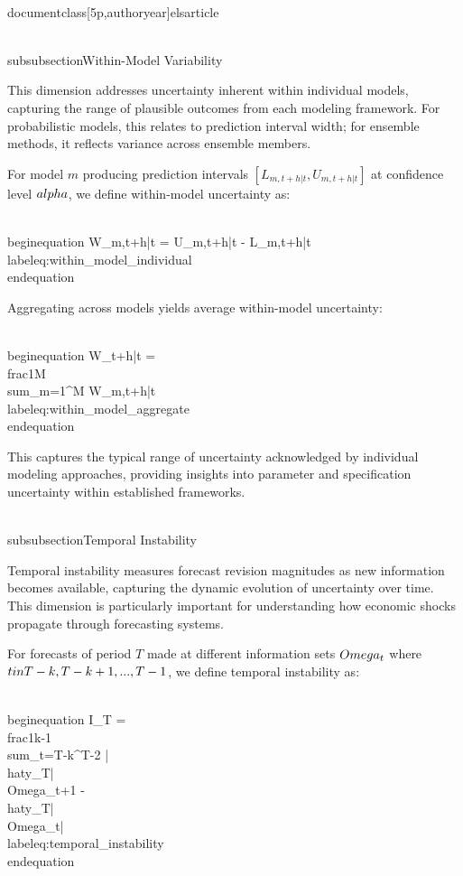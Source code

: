 \\documentclass[5p,authoryear]{elsarticle}
\begin{document}
\\subsubsection{Within-Model Variability}

This dimension addresses uncertainty inherent within individual models, capturing the range of plausible outcomes from each modeling framework. For probabilistic models, this relates to prediction interval width; for ensemble methods, it reflects variance across ensemble members.

For model $m$ producing prediction intervals $[L_{m,t+h|t}, U_{m,t+h|t}]$ at confidence level $\\alpha$, we define within-model uncertainty as:

\\begin{equation}
W_{m,t+h|t} = U_{m,t+h|t} - L_{m,t+h|t}
\\label{eq:within_model_individual}
\\end{equation}

Aggregating across models yields average within-model uncertainty:

\\begin{equation}
W_{t+h|t} = \\frac{1}{M} \\sum_{m=1}^{M} W_{m,t+h|t}
\\label{eq:within_model_aggregate}
\\end{equation}

This captures the typical range of uncertainty acknowledged by individual modeling approaches, providing insights into parameter and specification uncertainty within established frameworks.

\\subsubsection{Temporal Instability}

Temporal instability measures forecast revision magnitudes as new information becomes available, capturing the dynamic evolution of uncertainty over time. This dimension is particularly important for understanding how economic shocks propagate through forecasting systems.

For forecasts of period $T$ made at different information sets $\\Omega_t$ where $t \\in \\{T-k, T-k+1, ..., T-1\\}$, we define temporal instability as:

\\begin{equation}
I_T = \\frac{1}{k-1} \\sum_{t=T-k}^{T-2} |\\hat{y}_{T|\\Omega_{t+1}} - \\hat{y}_{T|\\Omega_t}|
\\label{eq:temporal_instability}
\\end{equation}
\end{document}

